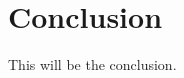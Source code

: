 \documentclass[preprintnumbers,nofootinbib,noshowpacs,eqsecnum,prd,superscriptaddress,letterpaper]{revtex4}
\begin{document}
\section{Conclusion}
\label{sec:conclusion}


This will be the conclusion.


\clearpage



  
  
  
  
  
  
\end{document}
